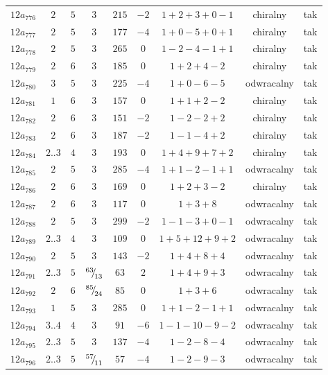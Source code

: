 \begin{longtable}{ccccccccc}
$12a_{776}$ & $2$ & $5$ & $3$ & $215$ & $-2$ & $1+2+3+0-1$ & chiralny & tak \\
$12a_{777}$ & $2$ & $5$ & $3$ & $177$ & $-4$ & $1+0-5+0+1$ & chiralny & tak \\
$12a_{778}$ & $2$ & $5$ & $3$ & $265$ & $0$ & $1-2-4-1+1$ & chiralny & tak \\
$12a_{779}$ & $2$ & $6$ & $3$ & $185$ & $0$ & $1+2+4-2$ & chiralny & tak \\
$12a_{780}$ & $3$ & $5$ & $3$ & $225$ & $-4$ & $1+0-6-5$ & odwracalny & tak \\
$12a_{781}$ & $1$ & $6$ & $3$ & $157$ & $0$ & $1+1+2-2$ & chiralny & tak \\
$12a_{782}$ & $2$ & $6$ & $3$ & $151$ & $-2$ & $1-2-2+2$ & chiralny & tak \\
$12a_{783}$ & $2$ & $6$ & $3$ & $187$ & $-2$ & $1-1-4+2$ & chiralny & tak \\
$12a_{784}$ & $2..3$ & $4$ & $3$ & $193$ & $0$ & $1+4+9+7+2$ & chiralny & tak \\
$12a_{785}$ & $2$ & $5$ & $3$ & $285$ & $-4$ & $1+1-2-1+1$ & odwracalny & tak \\
$12a_{786}$ & $2$ & $6$ & $3$ & $169$ & $0$ & $1+2+3-2$ & chiralny & tak \\
$12a_{787}$ & $2$ & $6$ & $3$ & $117$ & $0$ & $1+3+8$ & odwracalny & tak \\
$12a_{788}$ & $2$ & $5$ & $3$ & $299$ & $-2$ & $1-1-3+0-1$ & odwracalny & tak \\
$12a_{789}$ & $2..3$ & $4$ & $3$ & $109$ & $0$ & $1+5+12+9+2$ & odwracalny & tak \\
$12a_{790}$ & $2$ & $5$ & $3$ & $143$ & $-2$ & $1+4+8+4$ & odwracalny & tak \\
$12a_{791}$ & $2..3$ & $5$ & ${}^{63}{\mskip -5mu/\mskip -3mu}_{13}$ & $63$ & $2$ & $1+4+9+3$ & odwracalny & tak \\
$12a_{792}$ & $2$ & $6$ & ${}^{85}{\mskip -5mu/\mskip -3mu}_{24}$ & $85$ & $0$ & $1+3+6$ & odwracalny & tak \\
$12a_{793}$ & $1$ & $5$ & $3$ & $285$ & $0$ & $1+1-2-1+1$ & odwracalny & tak \\
$12a_{794}$ & $3..4$ & $4$ & $3$ & $91$ & $-6$ & $1-1-10-9-2$ & odwracalny & tak \\
$12a_{795}$ & $2..3$ & $5$ & $3$ & $137$ & $-4$ & $1-2-8-4$ & odwracalny & tak \\
$12a_{796}$ & $2..3$ & $5$ & ${}^{57}{\mskip -5mu/\mskip -3mu}_{11}$ & $57$ & $-4$ & $1-2-9-3$ & odwracalny & tak \\

\end{longtable}
